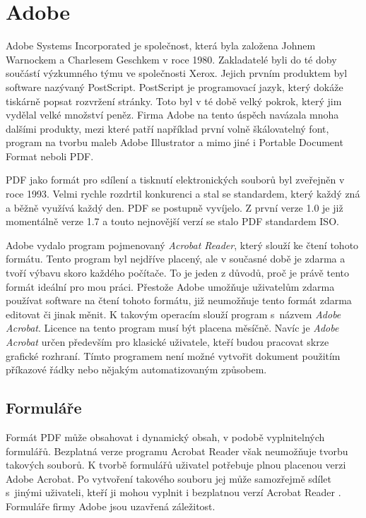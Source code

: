 \documentclass[czech,BP]{thesiskiv}
\begin{document}
\section{Adobe}
Adobe Systems Incorporated je společnost, která byla založena Johnem Warnockem a Charlesem Geschkem  v roce 1980. Zakladatelé byli do té doby součástí výzkumného týmu ve společnosti Xerox. Jejich prvním produktem byl software nazývaný PostScript. PostScript je programovací jazyk, který dokáže tiskárně popsat rozvržení stránky. Toto byl v té době velký pokrok, který jim vydělal velké množství peněz. Firma Adobe na tento úspěch navázala mnoha dalšími produkty, mezi které patří například první volně škálovatelný font, program na tvorbu maleb Adobe Illustrator a mimo jiné i Portable Document Format neboli PDF\cite{Adobe_story}. 

PDF jako formát pro sdílení a tisknutí elektronických souborů byl zveřejněn v roce 1993. Velmi rychle rozdrtil konkurenci a stal se standardem, který každý zná a běžně využívá každý den. PDF se postupně vyvíjelo. Z první verze 1.0 je již momentálně verze 1.7 a touto nejnovější verzí se stalo PDF standardem ISO. 

Adobe vydalo program pojmenovaný \emph{Acrobat Reader}, který slouží ke čtení tohoto formátu. Tento program byl nejdříve placený, ale v současné době je zdarma a tvoří výbavu skoro každého počítače. To je jeden z důvodů, proč je právě tento formát ideální pro mou práci\cite{Adobe_history}.
Přestože Adobe umožňuje uživatelům zdarma používat software na čtení tohoto formátu, již neumožňuje tento formát zdarma editovat či jinak měnit. K takovým operacím slouží program s~názvem \emph{Adobe Acrobat}. Licence na tento program musí být placena měsíčně. Navíc je \emph{Adobe Acrobat} určen především pro klasické uživatele, kteří budou pracovat skrze grafické rozhraní. Tímto programem není možné vytvořit dokument použitím příkazové řádky nebo nějakým automatizovaným způsobem. 

\subsection{Formuláře}
Formát PDF může obsahovat i dynamický obsah, v podobě vyplnitelných formulářů. Bezplatná verze programu Acrobat Reader však neumožňuje tvorbu takových souborů. K tvorbě formulářů uživatel potřebuje plnou placenou verzi Adobe Acrobat. Po vytvoření takového souboru jej může samozřejmě sdílet s~jinými uživateli, kteří ji mohou vyplnit i bezplatnou verzí Acrobat Reader \cite{Adobe_forms}. 
Formuláře firmy Adobe jsou uzavřená záležitost. 
\end{document}
